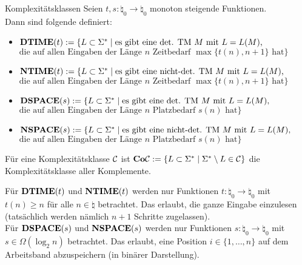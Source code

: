 \begin{Def}{Komplexitätsklassen}
    Seien $t, s\colon \natural_0 \rightarrow \natural_0$ monoton steigende Funktionen.\\
    Dann sind folgende  definiert:
    \begin{itemize}
        \item
        $\mathbf{DTIME}(t) := \{L \subset \Sigma^\ast \;|\;
        \text{es gibt eine det. TM } M \text{ mit } L = L(M) \text{,}$\\
        $\text{die auf allen Eingaben der Länge }
        n \text{ Zeitbedarf } \max\{t(n), n + 1\} \text{ hat}\}$

        \item
        $\mathbf{NTIME}(t) := \{L \subset \Sigma^\ast \;|\;
        \text{es gibt eine nicht-det. TM } M \text{ mit } L = L(M) \text{,}$\\
        $\text{die auf allen Eingaben der Länge }
        n \text{ Zeitbedarf } \max\{t(n), n + 1\} \text{ hat}\}$

        \item
        $\mathbf{DSPACE}(s) := \{L \subset \Sigma^\ast \;|\;
        \text{es gibt eine det. TM } M \text{ mit } L = L(M) \text{,}$\\
        $\text{die auf allen Eingaben der Länge }
        n \text{ Platzbedarf } s(n) \text{ hat}\}$

        \item
        $\mathbf{NSPACE}(s) := \{L \subset \Sigma^\ast \;|\;
        \text{es gibt eine nicht-det. TM } M \text{ mit } L = L(M) \text{,}$\\
        $\text{die auf allen Eingaben der Länge }
        n \text{ Platzbedarf } s(n) \text{ hat}\}$
    \end{itemize}
    Für eine Komplexitätsklasse $\mathcal{C}$ ist
    $\mathbf{Co}\mathcal{C} := \{L \subset \Sigma^\ast \;|\; \Sigma^\ast \setminus L \in \mathcal{C}\}$
    die Komplexitätsklasse aller Komplemente.
\end{Def}

\begin{Bem}
    Für $\mathbf{DTIME}(t)$ und $\mathbf{NTIME}(t)$ werden nur Funktionen
    $t\colon \natural_0 \rightarrow \natural_0$
    mit $t(n) \ge n$ für alle $n \in \natural$ betrachtet.
    Das erlaubt, die ganze Eingabe einzulesen
    (tatsächlich werden nämlich $n + 1$ Schritte zugelassen).\\
    Für $\mathbf{DSPACE}(s)$ und $\mathbf{NSPACE}(s)$ werden nur Funktionen
    $s\colon \natural_0 \rightarrow \natural_0$ mit $s \in \Omega(\log_2 n)$ betrachtet.
    Das erlaubt, eine Position $i \in \{1, \dotsc, n\}$ auf dem Arbeitsband abzuspeichern
    (in binärer Darstellung).
\end{Bem}

